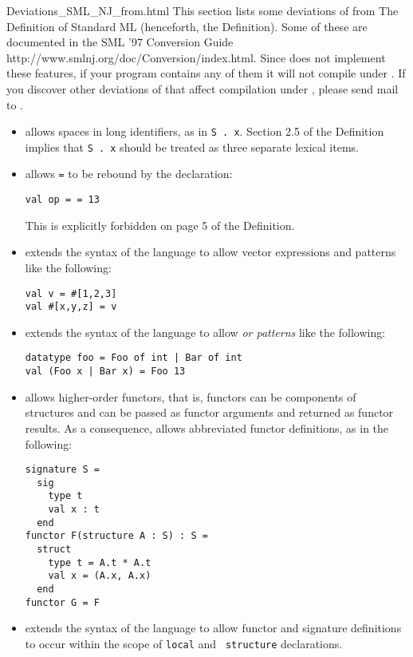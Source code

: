     {Deviations_SML_NJ_from.html}
%
This section lists some deviations of {\smlnj} from The Definition of
Standard ML (henceforth, the Definition).  Some of these are
documented in the
\htmladdnormallink
  {SML '97 Conversion Guide}
  {http://www.smlnj.org/doc/Conversion/index.html}.
Since {\mlton} does not implement these features, if your program
contains any of them it will not compile under {\mlton}.  If you discover
other deviations of {\smlnj} that affect compilation under {\mlton},
please send mail to {\mltonmail}.

\begin{itemize}
\item
{\smlnj} allows spaces in long identifiers, as in {\tt S . x}.
Section 2.5 of the Definition implies that {\tt S . x} should be
treated as three separate lexical items.

\item
{\smlnj} allows {\tt =} to be rebound by the declaration:
\begin{verbatim}
val op = = 13
\end{verbatim}
This is explicitly forbidden on page 5 of the Definition.

\item
{\smlnj} extends the syntax of the language to allow
vector expressions and patterns like the following:
\begin{verbatim}
val v = #[1,2,3]
val #[x,y,z] = v
\end{verbatim}
%
\item 
{\smlnj} extends the syntax of the language to allow {\em or patterns}
like the following:
\begin{verbatim}
datatype foo = Foo of int | Bar of int
val (Foo x | Bar x) = Foo 13
\end{verbatim}
%
\item
{\smlnj} allows higher-order functors, that is, functors can be
components of structures and can be passed as functor arguments and
returned as functor results.  As a consequence, {\smlnj} allows
abbreviated functor definitions, as in the following:
\begin{verbatim}
signature S =
  sig
    type t
    val x : t
  end
functor F(structure A : S) : S = 
  struct
    type t = A.t * A.t
    val x = (A.x, A.x)
  end
functor G = F
\end{verbatim} 
%
\item
{\smlnj} extends the syntax of the language to allow functor and
signature definitions to occur within the scope of {\tt local} and {\tt
structure} declarations.


\end{itemize}
